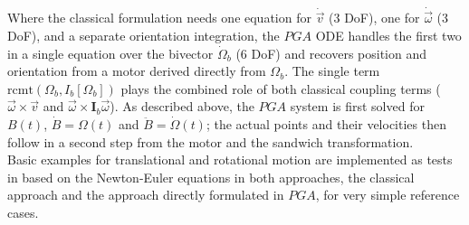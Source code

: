 Where the classical formulation needs one equation for
$\dot{\vec{v}}$ (3 DoF), one for $\dot{\vec{\omega}}$ (3 DoF), and a separate orientation
integration, the $PGA$ ODE handles the first two in a single equation over the bivector
$\dot{\Omega}_b$ (6 DoF) and recovers position and orientation from a motor derived
directly from $\Omega_b$. The single term $\mathrm{rcmt}(\Omega_b, I_b[\Omega_b])$ plays
the combined role of both classical coupling terms ($\vec{\omega}\times\vec{v}$ and
$\vec{\omega}\times\mathbf{I}_b\vec{\omega}$). As described above, the $PGA$ system is
first solved for $B(t)$, $\dot{B} = \Omega(t)$ and $\ddot{B} = \dot{\Omega}(t)$; the
actual points and their velocities then follow in a second step from the motor and the
sandwich transformation. \\

Basic examples for translational and rotational motion are implemented as tests in
 based on the Newton-Euler equations in both
approaches, the classical approach and the approach directly formulated in $PGA$, for very
simple reference cases.

